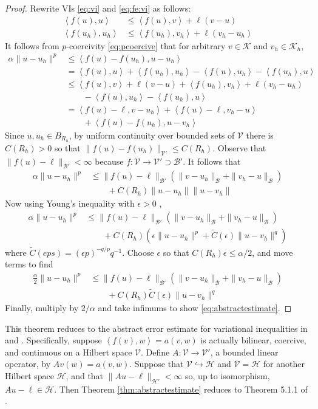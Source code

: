 \documentclass[hidelinks,onefignum,onetabnum,final]{siamart220329}  %
\newcommand{\eps}{\epsilon}
\newcommand{\cB}{\mathcal{B}}
\newcommand{\cH}{\mathcal{H}}
\newcommand{\cK}{\mathcal{K}}
\newcommand{\cV}{\mathcal{V}}
\newcommand{\ip}[2]{\left<#1,#2\right>}
\begin{document}
\begin{proof}  Rewrite VIs \eqref{eq:vi} and \eqref{eq:fe:vi} as follows:
\begin{align*}
\ip{f(u)}{u} &\le \ip{f(u)}{v} + \ell(v-u) \\
\ip{f(u_h)}{u_h} &\le \ip{f(u_h)}{v_h} + \ell(v_h-u_h)
\end{align*}
It follows from $p$-coercivity \eqref{eq:pcoercive} that for arbitrary $v\in\cK$ and $v_h\in\cK_h$,
\begin{align*}
\alpha \|u-u_h\|^p &\le \ip{f(u)-f(u_h)}{u-u_h} \\
  &= \ip{f(u)}{u} + \ip{f(u_h)}{u_h} - \ip{f(u)}{u_h} - \ip{f(u_h)}{u} \\
  &\le \ip{f(u)}{v} + \ell(v-u) + \ip{f(u_h)}{v_h} + \ell(v_h-u_h) \\
  &\qquad - \ip{f(u)}{u_h} - \ip{f(u_h)}{u} \\
  &= \ip{f(u)-\ell}{v-u_h} + \ip{f(u)-\ell}{v_h-u} \\
  &\qquad + \ip{f(u)-f(u_h)}{u-v_h}
\end{align*}
Since $u,u_h\in B_{R_h}$, by uniform continuity over bounded sets of $\cV$ there is $C(R_h)>0$ so that $\|f(u)-f(u_h)\|_{\cV'} \le C(R_h)$.  Observe that $\|f(u)-\ell\|_{\cB'} < \infty$ because $f:\cV\to\cV' \supset \cB'$.  It follows that
\begin{align*}
\alpha \|u-u_h\|^p &\le \|f(u)-\ell\|_{\cB'} \left(\|v-u_h\|_{\cB} + \|v_h-u\|_{\cB}\right) \\
  &\qquad + C(R_h) \|u-u_h\| \|u-v_h\|
\end{align*}
Now using Young's inequality with $\eps>0$ \cite[Appendix B.2]{Evans2010},
\begin{align*}
\alpha \|u-u_h\|^p &\le \|f(u)-\ell\|_{\cB'} \left(\|v-u_h\|_{\cB} + \|v_h-u\|_{\cB}\right) \\
  &\qquad + C(R_h) \left(\eps\|u-u_h\|^p + \tilde C(\eps) \|u-v_h\|^q\right)
\end{align*}
where $\tilde C(eps) = (\eps p)^{-q/p} q^{-1}$.  Choose $\eps$ so that $C(R_h) \eps \le \alpha/2$, and move terms to find
\begin{align*}
\frac{\alpha}{2} \|u-u_h\|^p &\le \|f(u)-\ell\|_{\cB'} \left(\|v-u_h\|_{\cB} + \|v_h-u\|_{\cB}\right) \\
  &\qquad + C(R_h) \tilde C(\eps) \|u-v_h\|^q
\end{align*}
Finally, multiply by $2/\alpha$ and take infimums to show \eqref{eq:abstractestimate}.
\end{proof}

This theorem reduces to the abstract error estimate for variational inequalities in \cite{Ciarlet2002} and \cite{Falk1974}.  Specifically, suppose $\ip{f(v)}{w}=a(v,w)$ is actually bilinear, coercive, and continuous on a Hilbert space $\cV$.  Define $A:\cV\to\cV'$, a bounded linear operator, by $Av(w) = a(v,w)$.  Suppose that $\cV\hookrightarrow \cH$ and $\overline{\cV} = \cH$ for another Hilbert space $\cH$, and that $\|Au-\ell\|_{\cH'} < \infty$ so, up to isomorphism, $Au-\ell \in\cH$.  Then Theorem \ref{thm:abstractestimate} reduces to Theorem 5.1.1 of \cite{Ciarlet2002}.



\end{document}
